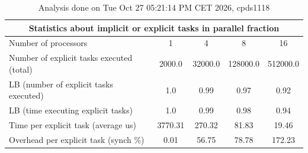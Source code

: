 \begin{table}[h]
\begin{center}
\begin{tabular}{|l|c|c|c|c|}
\hline
\multicolumn{5}{|c|}{Statistics about implicit or explicit tasks in parallel fraction} \\
\hline
\hline
Number of processors & 1 & 4 & 8 & 16 \\
\hline
\hline
Number of explicit tasks executed (total)        &          2000.0 &         32000.0 &        128000.0 &        512000.0 \\
\hline
LB (number of explicit tasks executed)           &             1.0 &            0.99 &            0.97 &            0.92 \\
\hline
LB (time executing explicit tasks)               &             1.0 &            0.99 &            0.98 &            0.94 \\
\hline
Time per explicit task (average us)                 &         3770.31 &          270.32 &           81.83 &           19.46 \\
\hline
Overhead per explicit task (synch \%)             &            0.01 &           56.75 &           78.78 &          172.23 \\
\hline
\end{tabular}
\end{center}
\caption{ Analysis done on Tue Oct 27 05:21:14 PM CET 2026, cpds1118}
\end{table}
